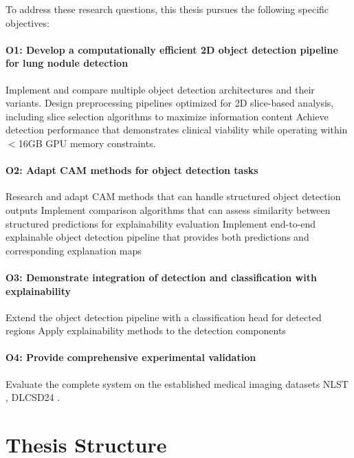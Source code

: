To address these research questions, this thesis pursues the following specific objectives:
\paragraph{O1: Develop a computationally efficient 2D object detection pipeline for lung nodule detection}
Implement and compare multiple object detection architectures and their variants.
Design preprocessing pipelines optimized for 2D slice-based analysis, including slice selection algorithms to maximize information content
Achieve detection performance that demonstrates clinical viability while operating within $<$16GB GPU memory constraints.

\paragraph{O2: Adapt CAM methods for object detection tasks}

Research and adapt CAM methods that can handle structured object detection outputs
Implement comparison algorithms that can assess similarity between structured predictions for explainability evaluation
Implement end-to-end explainable object detection pipeline that provides both predictions and corresponding explanation maps

\paragraph{O3: Demonstrate integration of detection and classification with explainability}

Extend the object detection pipeline with a classification head for detected regions
Apply explainability methods to the detection components

\paragraph{O4: Provide comprehensive experimental validation}
Evaluate the complete system on the established medical imaging datasets NLST \cite{nlst_data}, DLCSD24 \cite{tushar2025ailunghealthbenchmarking}.

\section{Thesis Structure}
\label{sec:thesis_structure}

